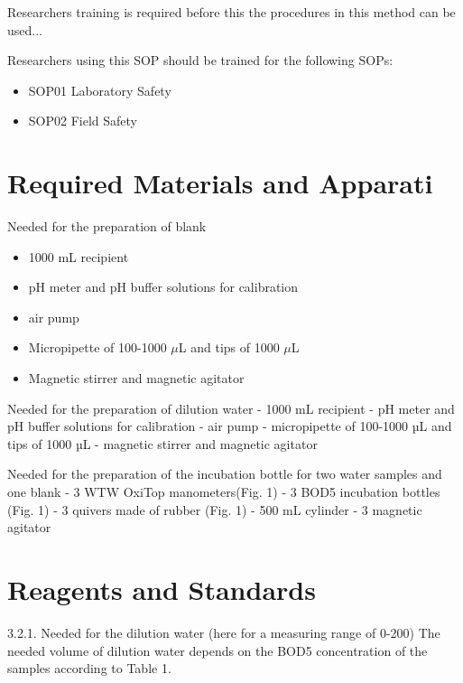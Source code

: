 \documentclass[12pt]{../SOP3_beta}
\begin{document}
\NP Researchers training is required before this the procedures in this method can be used... 

\NP Researchers using this SOP should be trained for the following SOPs:

\begin{itemize}
  \item SOP01 Laboratory Safety
  \item SOP02 Field Safety
\end{itemize}

\section{Required Materials and Apparati}

\NP Needed for the preparation of blank

\begin{itemize}
  \item 1000 mL recipient
  \item pH meter and pH buffer solutions for calibration
  \item air pump
  \item Micropipette of 100-1000 $\mu$L and tips of 1000 $\mu$L  
  \item Magnetic stirrer and magnetic agitator
\end{itemize}

\NP Needed for the preparation of dilution water
- 1000 mL recipient
- pH meter and pH buffer solutions for calibration
- air pump
- micropipette of 100-1000 µL and tips of 1000 µL
- magnetic stirrer and magnetic agitator

\NP Needed for the preparation of the incubation bottle for two water samples and one blank
- 3 WTW OxiTop manometers(Fig. 1)
- 3 BOD5 incubation bottles (Fig. 1)
- 3 quivers made of rubber (Fig. 1)
- 500 mL cylinder
- 3 magnetic agitator



\section{Reagents and Standards}

3.2.1. Needed for the dilution water (here for a measuring range of 0-200)
The needed volume of dilution water depends on the BOD5 concentration of the samples according
to Table 1.
\end{document}
